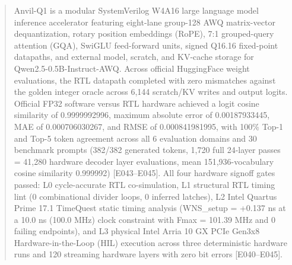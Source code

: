 \documentclass[11pt,a4paper]{article}
\begin{document}
\renewcommand{\abstractname}{\textcolor{vulcanblue}{Abstract}}\begin{abstract}\noindent Anvil-Q1 is a modular SystemVerilog W4A16 large language model inference accelerator featuring eight-lane group-128 AWQ matrix-vector dequantization,\allowbreak{} rotary position embeddings (\allowbreak{}RoPE)\allowbreak{},\allowbreak{} 7:1 grouped-query attention (\allowbreak{}GQA)\allowbreak{},\allowbreak{} SwiGLU feed-forward units,\allowbreak{} signed Q16.16 fixed-point datapaths,\allowbreak{} and external model,\allowbreak{} scratch,\allowbreak{} and KV-cache storage for Qwen2.5-0.5B-Instruct-AWQ. Across official HuggingFace weight evaluations,\allowbreak{} the RTL datapath completed with zero mismatches against the golden integer oracle across 6,\allowbreak{}144 scratch/\allowbreak{}KV writes and output logits. Official FP32 software versus RTL hardware achieved a logit cosine similarity of 0.9999992996,\allowbreak{} maximum absolute error of 0.00187933445,\allowbreak{} MAE of 0.000706030267,\allowbreak{} and RMSE of 0.000841981995,\allowbreak{} with 100\% Top-1 and Top-5 token agreement across all 6 evaluation domains and 30 benchmark prompts (\allowbreak{}382/\allowbreak{}382 generated tokens,\allowbreak{} 1,\allowbreak{}720 full 24-layer passes =\allowbreak{} 41,\allowbreak{}280 hardware decoder layer evaluations,\allowbreak{} mean 151,\allowbreak{}936-vocabulary cosine similarity 0.999992)\allowbreak{} [\allowbreak{}E043–E045]\allowbreak{}. All four hardware signoff gates passed: L0 cycle-accurate RTL co-simulation,\allowbreak{} L1 structural RTL timing lint (\allowbreak{}0 combinational divider loops,\allowbreak{} 0 inferred latches)\allowbreak{},\allowbreak{} L2 Intel Quartus Prime 17.1 TimeQuest static timing analysis (\allowbreak{}WNS\_\allowbreak{}setup =\allowbreak{} +\allowbreak{}0.137 ns at a 10.0 ns (\allowbreak{}100.0 MHz)\allowbreak{} clock constraint with Fmax =\allowbreak{} 101.39 MHz and 0 failing endpoints)\allowbreak{},\allowbreak{} and L3 physical Intel Arria 10 GX PCIe Gen3x8 Hardware-in-the-Loop (\allowbreak{}HIL)\allowbreak{} execution across three deterministic hardware runs and 120 streaming hardware layers with zero bit errors [\allowbreak{}E040–E045]\allowbreak{}.\par{}\end{abstract}\vspace{2pt}
\end{document}

